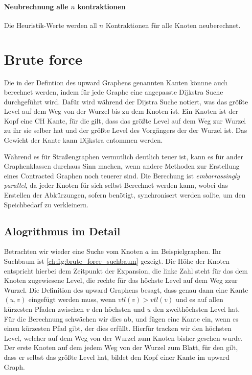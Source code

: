 \paragraph{Neubrechnung alle $n$ kontraktionen}
Die Heuristik-Werte werden all $n$ Kontraktionen für alle Knoten neuberechnet.

\section{Brute force}

Die in der Defintion des upward Graphens genannten Kanten könnne auch berechnet werden, indem für jede Graphe eine angepasste Dijkstra Suche durchgeführt wird.
Dafür wird während der Dijstra Suche notiert, was das größte Level auf dem Weg von der Wurzel bis zu dem Knoten ist.
Ein Knoten ist der Kopf eine CH Kante, für die gilt, dass das größte Level auf dem Weg zur Wurzel zu ihr sie selber hat und der größte Level des Vorgängers der der Wurzel ist.
Das Gewicht der Kante kann Dijkstra entommen werden.

Während es für Straßengraphen vermutlich deutlich teuer ist, kann es für ander Graphenklassen durchaus Sinn machen, wenn andere Methoden zur Erstellung eines Contracted Graphen noch teuerer sind.
Die Berechung ist \emph{embarrassingly parallel}, da jeder Knoten für sich selbst Berechnet werden kann, wobei das Erstellen der Abkürzungen, sofern benötigt, synchronisert werden sollte, um den Speichbedarf zu verkleinern.


\subsection{Alogrithmus im Detail}

Betrachten wir wieder eine Suche vom Knoten $a$ im Beispielgraphen.
Ihr Suchbaum ist \autoref{ch:fig:brute_force_suchbaum} gezeigt.
Die Höhe der Knoten entspricht hierbei dem Zeitpunkt der Expansion, die linke Zahl steht für das dem Knoten zugewiesene Level, die rechte für das höchste Level auf dem Weg zzur Wurzel.
Die Definition des upward Graphens besagt, dass genau dann eine Kante $(u, v)$ eingefügt werden muss, wenn ${vtl}(v) > {vtl}(v)$ und es auf allen kürzesten Pfaden zwischen $v$ den höchsten und $u$ den zweithöchsten Level hat.
Für die Berechnung schwächen wir dies ab, und fügen eine Kante ein, wenn es einen kürzesten Pfad gibt, der dies erfüllt.
Hierfür tracken wir den höchsten Level, welcher auf dem Weg von der Wurzel zum Knoten bisher gesehen wurde.
Der erste Knoten auf dem jedem Weg von der Wurzel zum Blatt, für den gilt, dass er selbst das größte Level hat, bildet den Kopf einer Kante im upward Graph.


